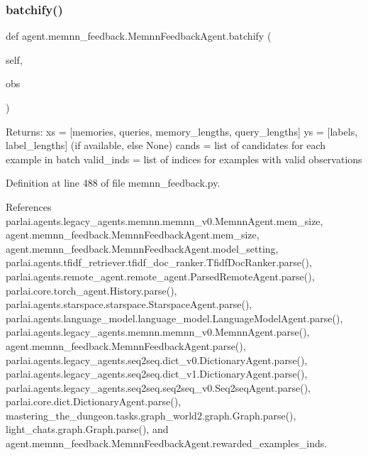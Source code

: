 \mbox{\label{classagent_1_1memnn__feedback_1_1MemnnFeedbackAgent_a901865f6607e3b5509831785bc1e29d0}} 
\subsubsection{\texorpdfstring{batchify()}{batchify()}}
{\footnotesize\ttfamily def agent.\+memnn\+\_\+feedback.\+Memnn\+Feedback\+Agent.\+batchify (\begin{DoxyParamCaption}\item[{}]{self,  }\item[{}]{obs }\end{DoxyParamCaption})}

\begin{DoxyVerb}Returns:
    xs = [memories, queries, memory_lengths, query_lengths]
    ys = [labels, label_lengths] (if available, else None)
    cands = list of candidates for each example in batch
    valid_inds = list of indices for examples with valid observations
\end{DoxyVerb}
 

Definition at line 488 of file memnn\+\_\+feedback.\+py.



References parlai.\+agents.\+legacy\+\_\+agents.\+memnn.\+memnn\+\_\+v0.\+Memnn\+Agent.\+mem\+\_\+size, agent.\+memnn\+\_\+feedback.\+Memnn\+Feedback\+Agent.\+mem\+\_\+size, agent.\+memnn\+\_\+feedback.\+Memnn\+Feedback\+Agent.\+model\+\_\+setting, parlai.\+agents.\+tfidf\+\_\+retriever.\+tfidf\+\_\+doc\+\_\+ranker.\+Tfidf\+Doc\+Ranker.\+parse(), parlai.\+agents.\+remote\+\_\+agent.\+remote\+\_\+agent.\+Parsed\+Remote\+Agent.\+parse(), parlai.\+core.\+torch\+\_\+agent.\+History.\+parse(), parlai.\+agents.\+starspace.\+starspace.\+Starspace\+Agent.\+parse(), parlai.\+agents.\+language\+\_\+model.\+language\+\_\+model.\+Language\+Model\+Agent.\+parse(), parlai.\+agents.\+legacy\+\_\+agents.\+memnn.\+memnn\+\_\+v0.\+Memnn\+Agent.\+parse(), agent.\+memnn\+\_\+feedback.\+Memnn\+Feedback\+Agent.\+parse(), parlai.\+agents.\+legacy\+\_\+agents.\+seq2seq.\+dict\+\_\+v0.\+Dictionary\+Agent.\+parse(), parlai.\+agents.\+legacy\+\_\+agents.\+seq2seq.\+dict\+\_\+v1.\+Dictionary\+Agent.\+parse(), parlai.\+agents.\+legacy\+\_\+agents.\+seq2seq.\+seq2seq\+\_\+v0.\+Seq2seq\+Agent.\+parse(), parlai.\+core.\+dict.\+Dictionary\+Agent.\+parse(), mastering\+\_\+the\+\_\+dungeon.\+tasks.\+graph\+\_\+world2.\+graph.\+Graph.\+parse(), light\+\_\+chats.\+graph.\+Graph.\+parse(), and agent.\+memnn\+\_\+feedback.\+Memnn\+Feedback\+Agent.\+rewarded\+\_\+examples\+\_\+inds.



